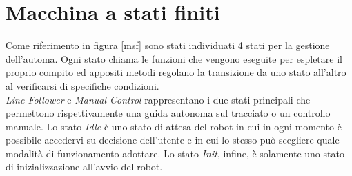 \section{Macchina a stati finiti}
Come riferimento in figura \ref{msf} sono stati individuati 4 stati per la gestione dell'automa. Ogni stato chiama le funzioni che vengono eseguite per espletare il proprio compito ed appositi metodi regolano la transizione da uno stato all'altro al verificarsi di specifiche condizioni.\\ 
\emph{Line Follower} e \emph{Manual Control} rappresentano i due stati principali che permettono rispettivamente una guida autonoma sul tracciato o un controllo manuale.
Lo stato \emph{Idle} è uno stato di attesa del robot in cui in ogni momento è possibile accedervi su decisione dell'utente e in cui lo stesso può scegliere quale modalità di funzionamento adottare.
Lo stato \emph{Init}, infine, è solamente uno stato di inizializzazione all'avvio del robot. 
